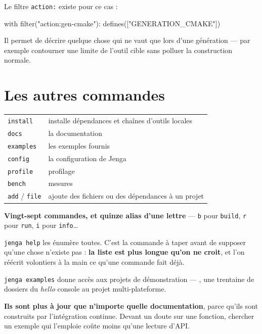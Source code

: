 \begin{nkretenir}
Le filtre \texttt{action:} existe pour ce cas :

\begin{nkcode}{}
with filter("action:gen-cmake"):
    defines(["GENERATION_CMAKE"])
\end{nkcode}

Il permet de décrire quelque chose qui ne vaut que lors d'une génération --- par
exemple contourner une limite de l'outil cible sans polluer la construction
normale.
\end{nkretenir}

\section{Les autres commandes}

\begin{center}
\begin{tabular}{@{}ll@{}}
\toprule
\texttt{install} & installe dépendances et chaînes d'outils locales \\
\texttt{docs} & la documentation \\
\texttt{examples} & les exemples fournis \\
\texttt{config} & la configuration de Jenga \\
\texttt{profile} & profilage \\
\texttt{bench} & mesures \\
\texttt{add} / \texttt{file} & ajoute des fichiers ou des dépendances à un projet \\
\bottomrule
\end{tabular}
\end{center}

\begin{nkretenir}
\textbf{Vingt-sept commandes, et quinze alias d'une lettre} --- \texttt{b} pour
\texttt{build}, \texttt{r} pour \texttt{run}, \texttt{i} pour \texttt{info}\dots

\texttt{jenga help} les énumère toutes. C'est la commande à taper avant de
supposer qu'une chose n'existe pas : \textbf{la liste est plus longue qu'on ne
croit}, et l'on réécrit volontiers à la main ce qu'une commande fait déjà.
\end{nkretenir}

\begin{nkretenir}
\texttt{jenga examples} donne accès aux projets de démonstration ---
, une trentaine de dossiers du \emph{hello} console au
projet multi-plateforme.

\textbf{Ils sont plus à jour que n'importe quelle documentation}, parce qu'ils
sont construits par l'intégration continue. Devant un doute sur une fonction,
chercher un exemple qui l'emploie coûte moins qu'une lecture d'API.
\end{nkretenir}

